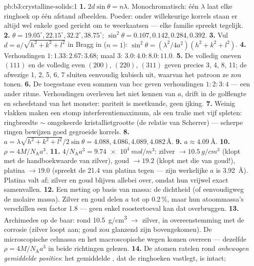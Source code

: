 \begin{solution}{pb:b3:crystalline-solids:1}
\textbf{1.} $2d\sin\theta = n\lambda$. Monochromatisch: één
$\lambda$ laat elke ringhoek op één afstand afbeelden. Poeder: onder
willekeurige korrels staan er altijd wel enkele goed gericht om te weerkaatsen --- elke
familie spreekt tegelijk.
\textbf{2.} $\theta = 19.05^\circ, 22.15^\circ, 32.2^\circ,
38.75^\circ$; $\sin^2\theta = 0.107, 0.142, 0.284, 0.392$.
\textbf{3.} Vul $d = a/\sqrt{h^2+k^2+l^2}$ in Bragg in
($n = 1$): $\sin^2\theta = (\lambda^2/4a^2)(h^2+k^2+l^2)$.
\textbf{4.} Verhoudingen $1 : 1.33 : 2.67 : 3.68$; maal 3:
$3.0 : 4.0 : 8.0 : 11.0$.
\textbf{5.} De volledig oneven $(111)$ en de volledig even $(200)$, $(220)$,
$(311)$ geven precies 3, 4, 8, 11; de afwezige 1, 2, 5, 6, 7 sluiten
eenvoudig kubisch uit, waarvan het patroon ze zou tonen.
\textbf{6.} De toegestane even sommen van bcc geven verhoudingen
$1:2:3:4$ --- een ander ritme. Verhoudingen overleven het niet kennen van
$a$, drift in de golflengte en scheefstand van het monster: pariteit is
meetkunde, geen ijking.
\textbf{7.} Weinig vlakken maken een stomp interferentiemaximum, als een
tralie met vijf spleten: ringbreedte $\sim$ omgekeerde
kristallietgrootte (de relatie van Scherrer) --- scherpe ringen bewijzen goed gegroeide
korrels.
\textbf{8.} $a = \lambda\sqrt{h^2+k^2+l^2}/2\sin\theta = 4.088,
4.086, 4.089, 4.082\,\unit{\angstrom}$.
\textbf{9.} $a \approx \qty{4.09}{\angstrom}$.
\textbf{10.} $\rho = 4M/N_{\text{A}}a^3$.
\textbf{11.} $4/N_{\text{A}}a^3 = \qty{9.74e4}{mol/m^3}$:
zilver $\to \qty{10.5}{g/cm^3}$ (klopt met de handboekwaarde
van zilver), goud $\to 19.2$ (klopt met die van goud!), platina $\to 19.0$
(spreekt de 21.4 van platina tegen --- zijn werkelijke $a$ is
\qty{3.92}{\angstrom}). Platina valt af; zilver en goud blijven
allebei over, omdat hun  vrijwel exact samenvallen.
\textbf{12.} Een meting op basis van massa: de dichtheid (of eenvoudigweg de molaire
massa). Zilver en goud delen $a$ tot op 0.2\,\%, maar hun atoommassa's
verschillen een factor 1.8 --- geen enkel roostertoeval kan
dat overbruggen.
\textbf{13.} Archimedes op de baar: rond \qty{10.5}{g/cm^3}
$\to$ zilver, in overeenstemming met de corrosie (zilver loopt aan;
goud zou glanzend zijn bovengekomen). De microscopische celmassa en het
macroscopische wegen komen overeen --- dezelfde
$\rho = 4M/N_{\text{A}}a^3$ in beide richtingen gelezen.
\textbf{14.} De atomen ratelen rond \emph{onbewogen gemiddelde
posities}: het gemiddelde , dat de ringhoeken vastlegt, is intact;

\end{solution}
